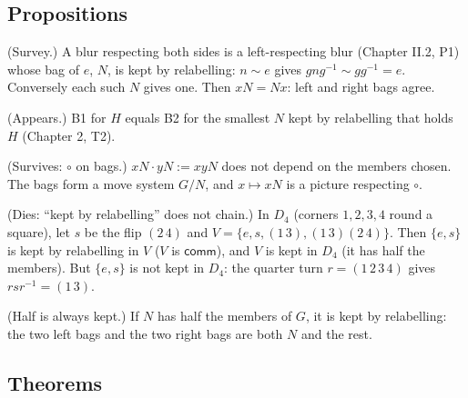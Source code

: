 \subsection*{Propositions}

\begin{lines}
\item[\lab{P1}] (Survey.) A blur respecting both sides is a left-respecting blur (Chapter II.2, P1) whose bag of $e$, $N$, is kept by relabelling: $n \sim e$ gives $g n g^{-1} \sim g g^{-1} = e$. Conversely each such $N$ gives one. Then $xN = Nx$: left and right bags agree.
\item[\lab{P2}] (Appears.) B1 for $H$ equals B2 for the smallest $N$ kept by relabelling that holds $H$ (Chapter 2, T2).
\item[\lab{P3}] (Survives: $\circ$ on bags.) $xN \cdot yN := xyN$ does not depend on the members chosen. The bags form a move system $G/N$, and $x \mapsto xN$ is a picture respecting $\circ$.
\item[\lab{P4}] (Dies: ``kept by relabelling'' does not chain.) In $D_4$ (corners $1, 2, 3, 4$ round a square), let $s$ be the flip $(2\,4)$ and $V = \{e, s, (1\,3), (1\,3)(2\,4)\}$. Then $\{e, s\}$ is kept by relabelling in $V$ ($V$ is $\mathsf{comm}$), and $V$ is kept in $D_4$ (it has half the members). But $\{e, s\}$ is not kept in $D_4$: the quarter turn $r = (1\,2\,3\,4)$ gives $r s r^{-1} = (1\,3)$.
\item[\lab{P5}] (Half is always kept.) If $N$ has half the members of $G$, it is kept by relabelling: the two left bags and the two right bags are both $N$ and the rest.
\end{lines}

\subsection*{Theorems}


